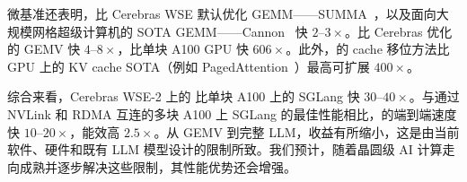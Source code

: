 微基准还表明，\gemm 比 Cerebras WSE 默认优化 GEMM——SUMMA~\cite{summa}，以及面向大规模网格超级计算机的 SOTA GEMM——Cannon~\cite{cannon} 快 $2$--$3\times$。\gemv 比 Cerebras 优化的 GEMV 快 $4$--$8\times$，比单块 A100 GPU 快 $606\times$。此外，\sys 的 cache 移位方法比 GPU 上的 KV cache SOTA（例如 PagedAttention~\cite{vllm}）最高可扩展 $400\times$。

综合来看，Cerebras WSE-2 上的 \sys 比单块 A100 上的 SGLang 快 $30$--$40\times$。与通过 NVLink 和 RDMA 互连的多块 A100 上 SGLang 的最佳性能相比，\sys 的端到端速度快 $10$--$20\times$，能效高 $2.5\times$。从 GEMV 到完整 LLM，收益有所缩小，这是由当前软件、硬件和既有 LLM 模型设计的限制所致。我们预计，随着晶圆级 AI 计算走向成熟并逐步解决这些限制，其性能优势还会增强。
